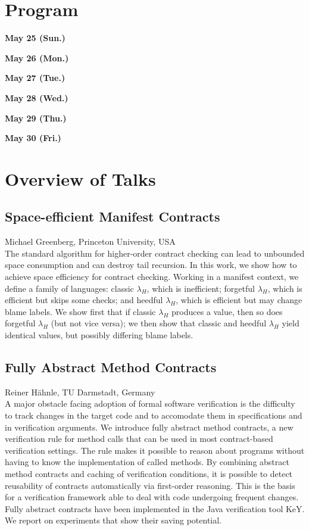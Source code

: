 \documentclass[11pt]{article}
\begin{document}
\section{Program}

\noindent\textbf{May 25 (Sun.)}


\noindent\textbf{May 26 (Mon.)}

\noindent\textbf{May 27 (Tue.)}

\noindent\textbf{May 28 (Wed.)}

\noindent\textbf{May 29 (Thu.)}

\noindent\textbf{May 30 (Fri.)}

\section{Overview of Talks}

\subsection*{Space-efficient Manifest Contracts}
\noindent Michael Greenberg, Princeton University, USA \\[0.5ex]

The standard algorithm for higher-order contract checking
can lead to unbounded space consumption and can destroy tail
recursion. In this work, we show how to achieve space efficiency for
contract checking. Working in a manifest context, we define a family
of languages: classic \(\lambda_H\), which is inefficient; forgetful \(\lambda_H\), which is
efficient but skips some checks; and heedful \(\lambda_H\), which is efficient
but may change blame labels. We show first that if classic \(\lambda_H\) produces
a value, then so does forgetful \(\lambda_H\) (but not vice versa); we then show
that classic and heedful \(\lambda_H\) yield identical values, but possibly
differing blame labels.

\subsection*{Fully Abstract Method Contracts}
\noindent Reiner H{\"a}hnle, TU Darmstadt, Germany \\[0.5ex]

A major obstacle facing adoption of formal software verification is
the difficulty to track changes in the target code and to accomodate
them in specifications and in verification arguments. We introduce
fully abstract method contracts, a new verification rule for method
calls that can be used in most contract-based verification
settings. The rule makes it possible to reason about programs without
having to know the implementation of called methods. By combining
abstract method contracts and caching of verification conditions, it
is possible to detect reusability of contracts automatically via
first-order reasoning. This is the basis for a verification framework
able to deal with code undergoing frequent changes. Fully abstract
contracts have been implemented in the Java verification tool KeY. We
report on experiments that show their saving potential.
\end{document}

